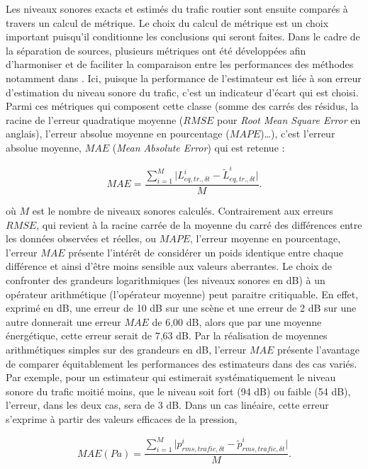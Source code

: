 Les niveaux sonores exacts et estimés du trafic routier sont ensuite comparés à travers un calcul de métrique. Le choix du calcul de métrique est un choix important puisqu'il conditionne les conclusions qui seront faites. 
Dans le cadre de la séparation de sources, plusieurs métriques ont été développées afin d'harmoniser et de faciliter la comparaison entre les performances des méthodes notamment dans \cite{vincent2006performance}.
Ici, puisque la performance de l'estimateur est liée à son erreur d'estimation du niveau sonore du trafic, c'est un indicateur d'écart qui est choisi. Parmi ces métriques qui composent cette classe (somme des carrés des résidus, la racine de l'erreur quadratique moyenne ($RMSE$ pour \textit{Root Mean Square Error} en anglais), l'erreur  absolue moyenne en pourcentage ($MAPE$)\dots), c'est l'erreur absolue moyenne, $MAE$ (\textit{Mean Absolute Error}) qui est retenue :

\begin{equation}\label{eq:mae}
MAE = \frac{\sum_{i = 1}^{M} \vert L_{eq, tr., \delta t}^i - \tilde{L}_{eq, tr., \delta t}^i \vert}{M}.
\end{equation}

où $M$ est le nombre de niveaux sonores calculés.
Contrairement aux erreurs $RMSE$, qui revient à la racine carrée de la moyenne du carré des différences entre les données observées et réelles, ou $MAPE$, l'erreur moyenne en pourcentage, l'erreur $MAE$ présente l'intérêt de considérer un poids identique entre chaque différence et ainsi d'être moins sensible aux valeurs aberrantes. 
Le choix de confronter des grandeurs logarithmiques (les niveaux sonores en dB) à un opérateur arithmétique (l'opérateur moyenne) peut paraitre critiquable. En effet, exprimé en dB, une erreur de 10 dB sur une scène et une erreur de 2 dB sur une autre donnerait une erreur $MAE$ de 6,00 dB, alors que par une moyenne énergétique, cette erreur serait de 7,63 dB. 
Par la réalisation de moyennes arithmétiques simples sur des grandeurs en dB, l'erreur $MAE$ présente l'avantage de comparer équitablement les performances des estimateurs dans des cas variés. Par exemple, pour un estimateur qui estimerait systématiquement le niveau sonore du trafic moitié moins, que le niveau soit fort (94 dB) ou faible (54 dB), l'erreur, dans les deux cas, sera de 3 dB. Dans un cas linéaire, cette erreur s'exprime à partir des valeurs efficaces de la pression, 

\begin{equation}
MAE (Pa) = \frac{\sum_{i = 1}^{M} \vert p_{rms, trafic, \delta t}^i - \tilde{p}_{rms, trafic, \delta t}^i \vert}{M}.
\end{equation}


